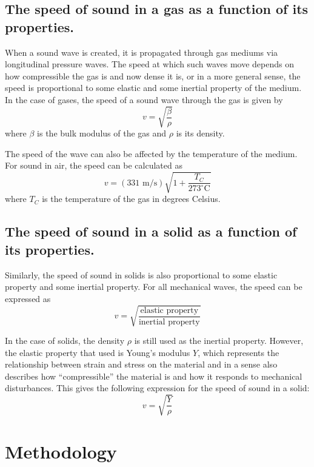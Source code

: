 \documentclass[twocolumn,english]{IEEEtran}
\theoremstyle{plain}
\theoremstyle{plain}
\begin{document}
\subsection{The speed of sound in a gas as a function of its properties.}
When a sound wave is created, it is propagated through gas mediums via longitudinal pressure waves. The speed at which such waves move depends on how compressible the gas is and now dense it is, or in a more general sense, the speed is proportional to some elastic and some inertial property of the medium. In the case of gases, the speed of a sound wave through the gas is given by
\begin{equation}
 v=\sqrt{\frac{\beta}{\rho}}
\end{equation}
where $\beta$ is the bulk modulus of the gas and $\rho$ is its density.

The speed of the wave can also be affected by the temperature of the medium. For sound in air, the speed can be calculated as
\begin{equation}
 v=(331\text{ m/s})\sqrt{1+\frac{T_C}{273^{\circ}\text{C}}}
\end{equation}
where $T_C$ is the temperature of the gas in degrees Celsius.


\subsection{The speed of sound in a solid as a function of its properties.}
Similarly, the speed of sound in solids is also proportional to some elastic property and some inertial property. For all mechanical waves, the speed can be expressed as
\begin{equation}
 v = \sqrt{\frac{\text{elastic property}}{\text{inertial property}}}
\end{equation}

In the case of solids, the density $\rho$ is still used as the inertial property. However, the elastic property that used is Young's modulus $Y$, which represents the relationship between strain and stress on the material and in a sense also describes how ``compressible'' the material is and how it responds to mechanical disturbances. This gives the following expression for the speed of sound in a solid:
\begin{equation}
 v=\sqrt{\frac{Y}{\rho}}
\end{equation}



\section{Methodology}
\end{document}
